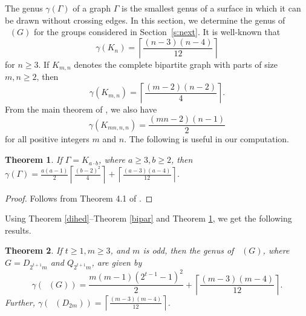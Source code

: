 \documentclass[reqno,12pt]{amsart}
\theoremstyle{plain}
\newtheorem{thm}{Theorem}[section]
\theoremstyle{definition}
\newcommand{\coeng}{\mathop{\mathcal{E}_c^-}}
\begin{document}
The genus $\gamma(\Gamma)$ of a graph $\Gamma$ is the smallest genus of a surface in
which it can be drawn without crossing edges.
In this section, we determine the genus of $\coeng(G)$ for the groups considered in  Section~\ref{s:next}. It is well-known that 
\begin{equation}\label{genus-Kn}
\gamma(K_n) = \left\lceil \frac{(n - 3)(n-4)}{12}\right
\rceil
\end{equation}
for $n \geq 3$. 
If $K_{m, n}$ denotes the complete bipartite graph with parts of size  $m, n \geq 2$, then 
\begin{equation}\label{genus-Km,n}
	\gamma(K_{m, n}) = \left\lceil \frac{(m - 2)(n-2)}{4}\right
	\rceil.
\end{equation}
From the main theorem of \cite{whi-1969}, we also have
\begin{equation}\label{genus-Kn,n,n}
\gamma(K_{mn, n, n}) =  \frac{(mn- 2)(n-1)}{2}
\end{equation}
for all positive integers $m$ and $n$.
The following is useful in our computation.
\begin{thm}\label{genus-Kab}
If $\Gamma = K_{a \cdot b}$, where $a\geq 3, b \geq 2$, then $\gamma(\Gamma) = \frac{a(a - 1)}{2}\left\lceil\frac{(b-2)^2}{4}\right
\rceil + \left\lceil \frac{(a-3)(a-4)}{12}\right
\rceil$.
\end{thm}
\begin{proof}
Follows from Theorem 4.1 of \cite{bn-2010}.
\end{proof}

Using Theorem \ref{dihed}--Theorem \ref{bipar} and Theorem \ref{genus-Kab}, we get the following results. 

\begin{thm} \label{dihed-genus} 
If $t \geq 1, m \geq 3$, and $m$ is odd, then the genus of $\coeng(G)$, where $G=D_{2^{t+1}m}$ and  $Q_{2^{t+1}m}$,  
are given by 
\[
 \gamma(\coeng(G)) = \frac{m(m - 1)(2^{t-1}-1)^2}{2} + \left\lceil \frac{(m-3)(m-4)}{12}\right
\rceil.
\]
Further,  $\gamma(\coeng(D_{2m})) = \left\lceil \frac{(m-3)(m-4)}{12}\right
\rceil$.
\end{thm}

\end{document}
